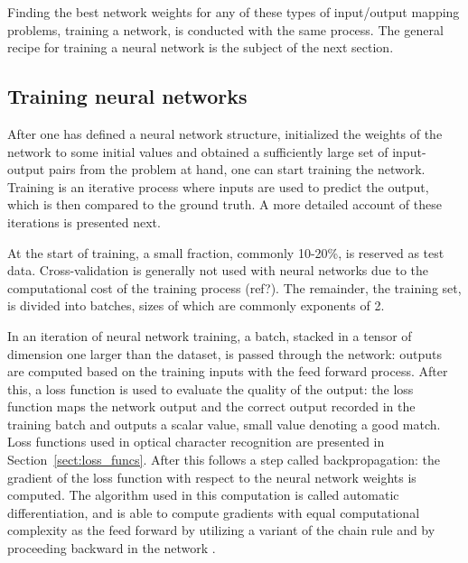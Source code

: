 \documentclass{article}
\begin{document}
Finding the best network weights for any of these types of input/output mapping problems, training 
a network, is conducted with the same process.
The general recipe for training a neural network is the subject of the next section.

\subsection{Training neural networks}

After one has defined a neural network structure, initialized the weights of the network 
to some initial values and obtained a sufficiently large set of input-output pairs from the problem at hand,
one can start training the network. Training is an iterative process where inputs are used to 
predict the output, which is then compared to the ground truth. A more detailed account of these iterations
is presented next.

At the start of training, a small fraction, commonly 10-20\%, is reserved as test data. Cross-validation is 
generally not used with neural networks due to the computational cost of the training process (ref?). The remainder, 
the training set, is divided into batches, sizes of which are commonly exponents of 2.

In an iteration of neural network training, a batch, stacked in a tensor of dimension one larger than the dataset, 
is passed through the network: outputs are computed based on the training inputs with the feed forward process.
After this, a loss function is used to evaluate the quality of the output: the loss function maps the network output and 
the correct output recorded in the training batch and outputs a scalar value, small value denoting a good 
match. Loss functions used in optical character recognition are presented in Section~\ref{sect:loss_funcs}.
After this follows a step called backpropagation: the gradient of the loss function with respect 
to the neural network weights is computed. The algorithm used in this computation is called automatic differentiation,
and is able to compute gradients with equal computational complexity as the feed forward by utilizing 
a variant of the chain rule and by proceeding backward in the network \cite{princebook}.
\end{document}
